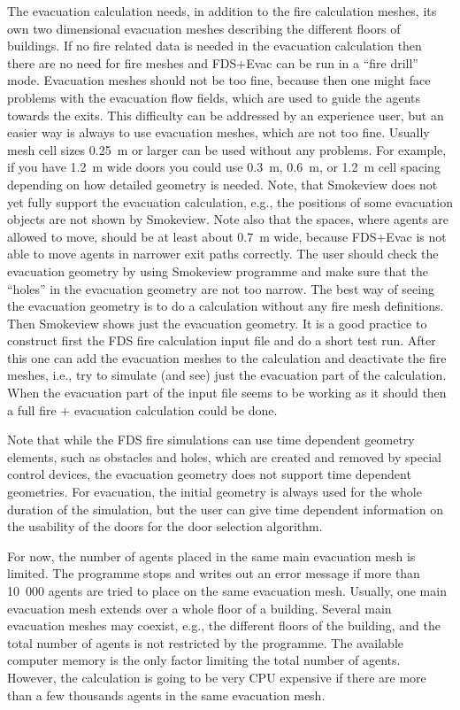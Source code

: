 \documentclass[12pt,a4paper,final,twoside]{stylevk}
\begin{document}
The evacuation calculation needs, in addition to the fire calculation
meshes, its own two dimensional evacuation meshes describing the
different floors of buildings.  If no fire related data is needed in
the evacuation calculation then there are no need for fire meshes and
FDS+Evac can be run in a ``fire drill'' mode.  Evacuation meshes
should not be too fine, because then one might face problems with the
evacuation flow fields, which are used to guide the agents towards the
exits.  This difficulty can be addressed by an experience user, but an
easier way is always to use evacuation meshes, which are not too fine.
Usually mesh cell sizes 0.25~m or larger can be used without any
problems.  For example, if you have 1.2~m wide doors you could use
0.3~m, 0.6~m, or 1.2~m cell spacing depending on how detailed geometry
is needed.  Note, that Smokeview does not yet fully support the
evacuation calculation, e.g., the positions of some evacuation
objects are not shown by Smokeview.  Note also that the spaces, where
agents are allowed to move, should be at least about 0.7~m wide,
because FDS+Evac is not able to move agents in narrower exit paths
correctly.  The user should check the evacuation geometry by using
Smokeview programme and make sure that the ``holes'' in the evacuation
geometry are not too narrow.  The best way of seeing the evacuation
geometry is to do a calculation without any fire mesh definitions.
Then Smokeview shows just the evacuation geometry.  It is a good
practice to construct first the FDS fire calculation input file and do
a short test run.  After this one can add the evacuation meshes to the
calculation and deactivate the fire meshes, i.e., try to
simulate (and see) just the evacuation part of the calculation.  When
the evacuation part of the input file seems to be working as it should
then a full fire + evacuation calculation could be done.


Note that while the FDS fire simulations can use time dependent
geometry elements, such as obstacles and holes, which are created and
removed by special control devices, the evacuation geometry does not
support time dependent geometries.  For evacuation, the initial
geometry is always used for the whole duration of the simulation, but
the user can give time dependent information on the usability of the
doors for the door selection algorithm.


For now, the number of agents placed in the same main evacuation mesh
is limited.  The programme stops and writes out an error message if
more than 10~000 agents are tried to place on the same evacuation
mesh.  Usually, one main evacuation mesh extends over a whole floor of
a building.  Several main evacuation meshes may coexist, e.g.,
the different floors of the building, and the total number of agents
is not restricted by the programme.  The available computer memory is
the only factor limiting the total number of agents.  However, the
calculation is going to be very CPU expensive if there are more than a
few thousands agents in the same evacuation mesh.
\end{document}
